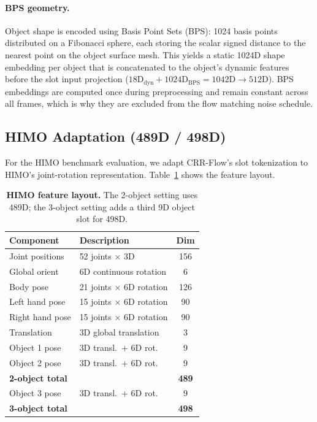 \documentclass[sigconf, screen, review, anonymous]{acmart}
\begin{document}
\paragraph{BPS geometry.}
Object shape is encoded using Basis Point Sets (BPS): 1024 basis points distributed on a Fibonacci sphere, each storing the scalar signed distance to the nearest point on the object surface mesh. This yields a static 1024D shape embedding per object that is concatenated to the object's dynamic features before the slot input projection ($18\text{D}_{\text{dyn}} + 1024\text{D}_{\text{BPS}} = 1042\text{D} \rightarrow 512\text{D}$). BPS embeddings are computed once during preprocessing and remain constant across all frames, which is why they are excluded from the flow matching noise schedule.


\subsection{HIMO Adaptation (489D / 498D)}

For the HIMO benchmark evaluation, we adapt CRR-Flow's slot tokenization to HIMO's joint-rotation representation. Table~\ref{tab:himo_layout} shows the feature layout.

\begin{table}[t]
  \caption{\textbf{HIMO feature layout.} The 2-object setting uses 489D; the 3-object setting adds a third 9D object slot for 498D.}
  \label{tab:himo_layout}
  \centering
  \small
  \begin{tabular}{@{}llc@{}}
    \toprule
    Component & Description & Dim \\
    \midrule
    Joint positions & 52 joints $\times$ 3D & 156 \\
    Global orient & 6D continuous rotation & 6 \\
    Body pose & 21 joints $\times$ 6D rotation & 126 \\
    Left hand pose & 15 joints $\times$ 6D rotation & 90 \\
    Right hand pose & 15 joints $\times$ 6D rotation & 90 \\
    Translation & 3D global translation & 3 \\
    Object 1 pose & 3D transl.\ + 6D rot. & 9 \\
    Object 2 pose & 3D transl.\ + 6D rot. & 9 \\
    \midrule
    \multicolumn{2}{l}{\textbf{2-object total}} & \textbf{489} \\
    Object 3 pose & 3D transl.\ + 6D rot. & 9 \\
    \midrule
    \multicolumn{2}{l}{\textbf{3-object total}} & \textbf{498} \\
    \bottomrule
  \end{tabular}
\end{table}
\end{document}
